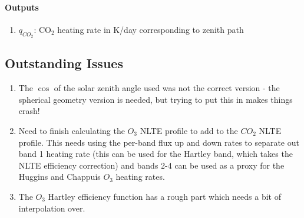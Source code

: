    \paragraph{Outputs}
   \begin{enumerate}
   \item $q_{CO_2}$: CO$_2$ heating rate in K/day corresponding to zenith path 
   \end{enumerate}

\subsection{Outstanding Issues}

\begin{enumerate}
\item The $\cos$ of the solar zenith angle used was not the correct 
  version - the spherical geometry version is needed, but trying 
  to put this in makes things crash!
\item Need to finish calculating the $O_3$ NLTE profile to add to the 
  $CO_2$ NLTE profile. This needs using the per-band flux up and down
  rates to separate out band 1 heating rate (this can be used for the 
  Hartley band, which takes the NLTE efficiency correction) and bands
  2-4 can be used as a proxy for the Huggins and Chappuis $O_3$ heating 
  rates. 
\item The $O_3$ Hartley efficiency function has a rough part which 
  needs a bit of interpolation over. 
\end{enumerate}
